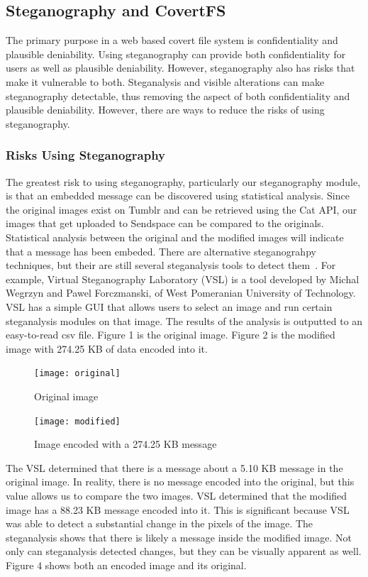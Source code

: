 \subsection{Steganography and CovertFS}


The primary purpose in a web based covert file system is confidentiality and plausible deniability. Using steganography can provide both confidentiality for users as well as plausible deniability. However, steganography also has risks that make it vulnerable to both. Steganalysis and visible alterations\cite{PierreRicher2003} can make steganography detectable, thus removing the aspect of both confidentiality and plausible deniability. However, there are ways to reduce the risks of using steganography. 

\subsubsection{Risks Using Steganography}

The greatest risk to using steganography, particularly our steganography module, is that an embedded message can be discovered using statistical analysis. Since the original images exist on Tumblr and can be retrieved using the Cat API, our images that get uploaded to Sendspace can be compared to the originals. Statistical analysis between the original and the modified images will indicate that a message has been embeded. There are alternative steganograhpy techniques, but their are still several steganalysis tools to detect them~\cite{Laden}. For example, Virtual Steganography Laboratory (VSL) is a tool developed by Michal Wegrzyn and Pawel Forczmanski, of West Pomeranian University of Technology. VSL has a simple GUI that allows users to select an image and run certain steganalysis modules on that image. The results of the analysis is outputted to an easy-to-read csv file. Figure 1 is the original image. Figure 2 is the modified image with 274.25 KB of data encoded into it. 
\begin{figure}[h]
	\texttt{[image: original]}
	\caption{Original image}
\end{figure}
\begin{figure}[h]
	\texttt{[image: modified]}
	\caption{Image encoded with a 274.25 KB message}
\end{figure}
The VSL determined that there is a message about a 5.10 KB message in the original image. In reality, there is no message encoded into the original, but this value allows us to compare the two images. VSL determined that the modified image has a 88.23 KB message encoded into it. This is significant because VSL was able to detect a substantial change in the pixels of the image. The steganalysis shows that there is likely a message inside the modified image. Not only can steganalysis detected changes, but they can be visually apparent as well. Figure 4 shows both an encoded image and its original.

